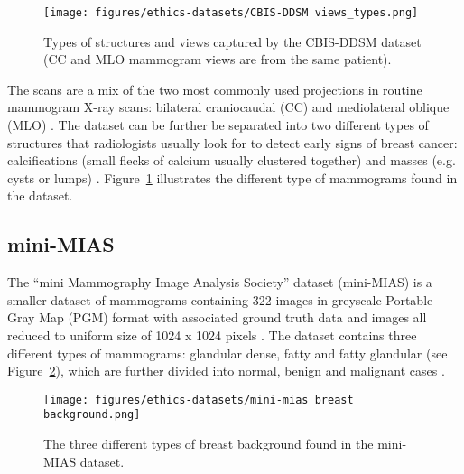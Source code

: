 \begin{figure}[ht]
\centerline{\texttt{[image: figures/ethics-datasets/CBIS-DDSM views\_types.png]}}
\caption{\label{fig:ethics-datasets-CBIS-DDSM views_types}Types of structures and views captured by the CBIS-DDSM dataset (CC and MLO mammogram views are from the same patient).}
\end{figure}

The scans are a mix of the two most commonly used projections in routine mammogram X-ray scans: bilateral craniocaudal (CC) and mediolateral oblique (MLO) \citep{Elter2009}. The dataset can be further be separated into two different types of structures that radiologists usually look for to detect early signs of breast cancer: calcifications (small flecks of calcium usually clustered together) and masses (e.g. cysts or lumps) \citep{breastcancerorg2018}. Figure~\ref{fig:ethics-datasets-CBIS-DDSM views_types} illustrates the different type of mammograms found in the dataset.

\subsection{mini-MIAS}
\label{sec:ethics-mini-MIAS-dataset-description}

The ``mini Mammography Image Analysis Society'' dataset (mini-MIAS) is a smaller dataset of mammograms containing 322 images in greyscale Portable Gray Map (PGM) format with associated ground truth data \citep{Suckling1994} and images all reduced to uniform size of 1024 x 1024 pixels \citep{Vishrutha2014}. The dataset contains three different types of mammograms: glandular dense, fatty and fatty glandular (see Figure~\ref{fig:ethics-datasets-mini-mias breast background}), which are further divided into normal, benign and malignant cases \citep{Hepsag2017}.

\begin{figure}[ht]
\centerline{\texttt{[image: figures/ethics-datasets/mini-mias breast background.png]}}
\caption{\label{fig:ethics-datasets-mini-mias breast background}The three different types of breast background found in the mini-MIAS dataset.}
\end{figure}